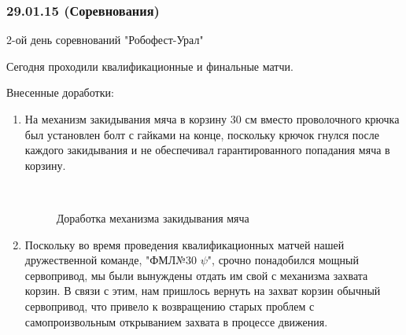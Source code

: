 \subsubsection{29.01.15 (Соревнования)}
\begin{center}
	2-ой день соревнований "Робофест-Урал"
\end{center}
Сегодня проходили квалификационные и финальные матчи.
\newline 

Внесенные доработки:
\begin{enumerate}
	\item На механизм закидывания мяча в корзину 30 см вместо проволочного крючка был установлен болт с гайками на конце, поскольку крючок гнулся после каждого закидывания и не обеспечивал гарантированного попадания мяча в корзину.
	\begin{figure}[H]
		\begin{minipage}[h]{0.2\linewidth}
			\center  
		\end{minipage}
		\begin{minipage}[h]{0.6\linewidth}
			\caption{Доработка механизма закидывания мяча}
		\end{minipage}
	\end{figure}
	
	\item Поскольку во время проведения квалификационных матчей нашей дружественной команде, "ФМЛ№30 ${\psi}$", срочно понадобился мощный сервопривод, мы были вынуждены отдать им свой с механизма захвата корзин. В связи с этим, нам пришлось вернуть на захват корзин обычный сервопривод, что привело к возвращению старых проблем с самопроизвольным открыванием захвата в процессе движения.
	
\end{enumerate}

